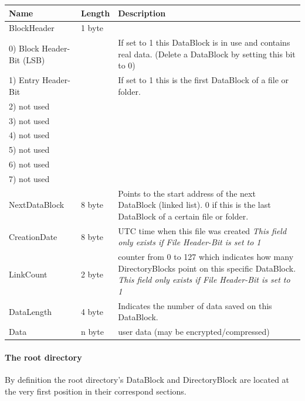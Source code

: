 \begin{tabular}{|l|l|p{5cm}|}
\hline
\textbf{Name} & \textbf{Length} & \textbf{Description}
\\  \hline
BlockHeader & 1 byte &
\\
\hspace{0.2cm} 0) Block Header-Bit (LSB) & &  If set to 1 this DataBlock is in use and contains real data. (Delete a DataBlock by setting this bit to 0)
\\
\hspace{0.2cm} 1) Entry Header-Bit & &  If set to 1 this is the first DataBlock
of a file or folder.
\\
\hspace{0.2cm} 2) not used & &
\\
\hspace{0.2cm} 3) not used & &
\\
\hspace{0.2cm} 4) not used & &
\\
\hspace{0.2cm} 5) not used & &
\\
\hspace{0.2cm} 6) not used & &
\\
\hspace{0.2cm} 7) not used & &

\\  \hline
NextDataBlock & 8 byte &
Points to the start address of the next DataBlock (linked list).
0 if this is the last DataBlock of a certain file or folder.
\\  \hline
CreationDate & 8 byte & UTC time when this file was created
\newline \textit{This field only exists if File Header-Bit is set to 1}
\\  \hline

LinkCount & 2 byte & counter from 0 to 127 which indicates how many DirectoryBlocks point on this specific DataBlock.
\newline \textit{This field only exists if File Header-Bit is set to 1}
\\  \hline


DataLength & 4 byte &
Indicates the number of data saved on this DataBlock.

\\  \hline
Data & n byte & user data (may be encrypted/compressed)
\\  \hline
\end{tabular}


\paragraph{The root directory}

By definition the root directory's DataBlock and DirectoryBlock are located at
the very first position in their correspond sections.

